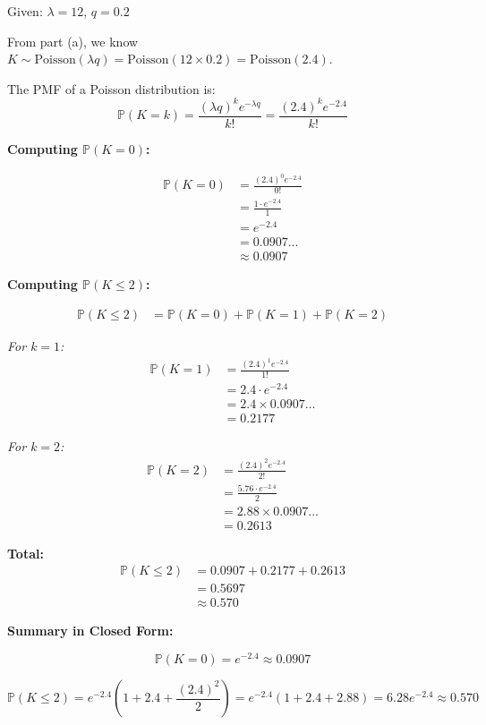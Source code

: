 \documentclass[12pt]{article}
\begin{document}
\begin{solution}
Given: \(\lambda = 12\), \(q = 0.2\)

From part (a), we know \(K \sim \text{Poisson}(\lambda q) = \text{Poisson}(12 \times 0.2) = \text{Poisson}(2.4)\).

The PMF of a Poisson distribution is:
\[
\mathbb{P}(K = k) = \frac{(\lambda q)^k e^{-\lambda q}}{k!} = \frac{(2.4)^k e^{-2.4}}{k!}
\]

\textbf{Computing \(\mathbb{P}(K = 0)\):}

\begin{align*}
\mathbb{P}(K = 0) &= \frac{(2.4)^0 e^{-2.4}}{0!} \\
&= \frac{1 \cdot e^{-2.4}}{1} \\
&= e^{-2.4} \\
&= 0.0907... \\
&\approx \boxed{0.0907}
\end{align*}

\textbf{Computing \(\mathbb{P}(K \leq 2)\):}

\begin{align*}
\mathbb{P}(K \leq 2) &= \mathbb{P}(K = 0) + \mathbb{P}(K = 1) + \mathbb{P}(K = 2)
\end{align*}

\textit{For \(k = 1\):}
\begin{align*}
\mathbb{P}(K = 1) &= \frac{(2.4)^1 e^{-2.4}}{1!} \\
&= 2.4 \cdot e^{-2.4} \\
&= 2.4 \times 0.0907... \\
&= 0.2177
\end{align*}

\textit{For \(k = 2\):}
\begin{align*}
\mathbb{P}(K = 2) &= \frac{(2.4)^2 e^{-2.4}}{2!} \\
&= \frac{5.76 \cdot e^{-2.4}}{2} \\
&= 2.88 \times 0.0907... \\
&= 0.2613
\end{align*}

\textbf{Total:}
\begin{align*}
\mathbb{P}(K \leq 2) &= 0.0907 + 0.2177 + 0.2613 \\
&= 0.5697 \\
&\approx \boxed{0.570}
\end{align*}

\textbf{Summary in Closed Form:}

\[
\boxed{\mathbb{P}(K = 0) = e^{-2.4} \approx 0.0907}
\]

\[
\boxed{\mathbb{P}(K \leq 2) = e^{-2.4}\left(1 + 2.4 + \frac{(2.4)^2}{2}\right) = e^{-2.4}(1 + 2.4 + 2.88) = 6.28 e^{-2.4} \approx 0.570}
\]
\end{solution}
\end{document}
